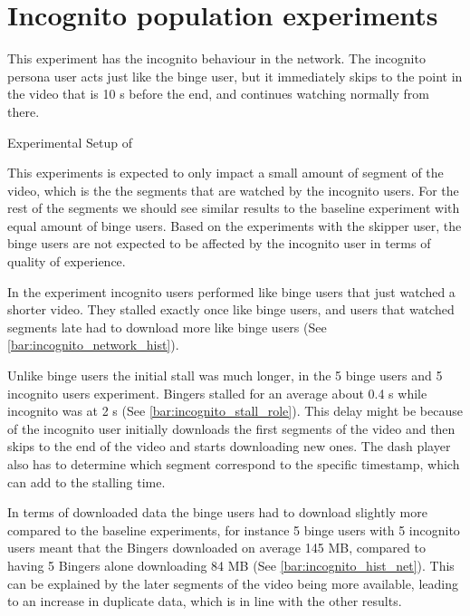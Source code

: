 \if{}

\fi
 
\FloatBarrier \section{Incognito population experiments}
\label{sec:eval_incognito}
This experiment has the incognito behaviour in the network.
The incognito persona user acts just like the binge user, but it immediately skips to the point in the video that is 10 \ac{s} before the end, and continues watching normally from there.

\begin{table}[!htbp]
    \myfloatalign
    \caption[Experimental Setup of Incognito]{Experimental Setup of }
    \label{tab:exp_overview_incognito}
    
\end{table}

This experiments is expected to only impact a small amount of segment of the video, which is the the segments that are watched by the incognito users.
For the rest of the segments we should see similar results to the baseline experiment with equal amount of binge users. Based on the experiments with the skipper user, the binge users are not expected to be affected by the incognito user in terms of quality of experience.

In the experiment incognito users performed like binge users that just watched a shorter video. They stalled exactly once like binge users, and users that watched segments late had to download more like binge users (See \autoref{bar:incognito_network_hist}). 

\if{}

\fi

Unlike binge users the initial stall was much longer, in the 5 binge users and 5 incognito users experiment. Bingers stalled for an average about 0.4 \ac{s} while incognito was at 2 \ac{s} (See \autoref{bar:incognito_stall_role}). This delay might be because of the incognito user initially downloads the first segments of the video and then skips to the end of the video and starts downloading new ones. The dash player also has to determine which segment correspond to the specific timestamp, which can add to the stalling time.

\if{}

\fi

In terms of downloaded data the binge users had to download slightly more compared to the baseline experiments, for instance 5 binge users with 5 incognito users meant that the Bingers downloaded on average 145 \ac{MB}, compared to having 5 Bingers alone downloading 84 \ac{MB} (See \autoref{bar:incognito_hist_net}). This can be explained by the later segments of the video being more available, leading to an increase in duplicate data, which is in line with the other results.

